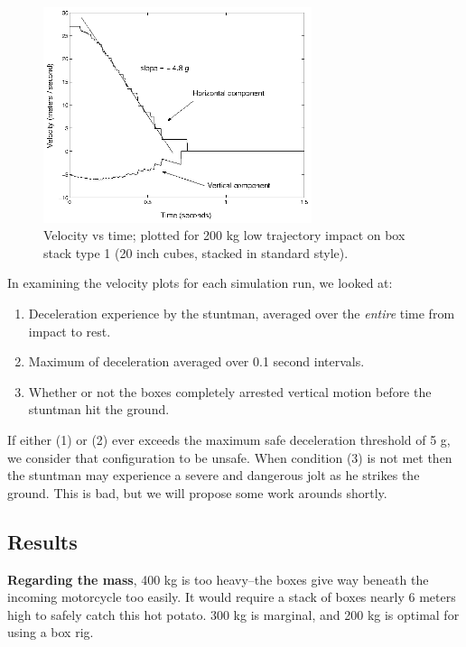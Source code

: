 \documentclass[12pt,a4paper,titlepage]{article}
\begin{document}
\begin{figure}
\caption{\label{velocityplot} Velocity vs time; plotted for 200 kg low trajectory impact on box stack
type 1 (20 inch cubes, stacked in standard style).}
\begin{center}
\includegraphics[width=0.7\textwidth]{velocity_case_1_linear.eps}
\end{center}
\end{figure}

In examining the velocity plots for each simulation run, we looked at:
\begin{enumerate}
\item Deceleration experience by the stuntman, averaged over the {\it entire} time from impact to rest.
\item Maximum of deceleration averaged over 0.1 second intervals.
\item Whether or not the boxes completely arrested vertical motion before the stuntman hit the ground.
\end{enumerate}
If either (1) or (2) ever exceeds the maximum safe deceleration threshold of 5 g, we consider that configuration to be unsafe.
When condition (3) is not met then the stuntman may experience a severe and dangerous jolt as he strikes the ground.
This is bad, but we will propose some work arounds shortly.

\subsection{Results}

{\bf Regarding the mass}, 400 kg is too heavy--the boxes give way beneath the incoming motorcycle too easily.
It would require a stack of boxes nearly 6 meters high to safely catch this hot potato.  300 kg
is marginal, and 200 kg is optimal for using a box rig.
\end{document}
